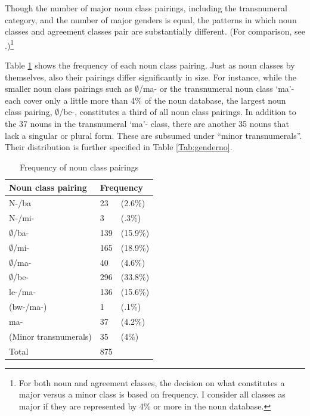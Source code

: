 \noindent Though the number of major noun class pairings, including the transnumeral category, and the number of major genders is equal, the patterns in which noun classes and agreement classes pair are substantially different. (For comparison, see .)\footnote{For both noun and agreement classes, the decision on what constitutes a major versus a minor class is based on frequency. I consider all classes as major if they are represented by 4\% or more in the noun database.}

Table \ref{Tab:NCpair} shows the frequency of each noun class pairing. Just as noun classes by themselves, also their pairings differ significantly in size. For instance, while the smaller noun class pairings such as $\emptyset$/ma- or the transnumeral noun class `ma'- each cover only a little more than 4\%  of the noun database, the largest noun class pairing, $\emptyset$/be-, constitutes a third of all noun class pairings. 
In addition to the 37 nouns in the transnumeral `ma'- class, there are another 35 nouns that lack a singular or plural form. These are subsumed under ``minor transnumerals''. Their distribution is further specified in Table \ref{Tab:genderno}.


\begin{table} 
\centering
\begin{tabular}{l|ll}
 \midrule
Noun class pairing	&  \multicolumn{2}{l}{Frequency} \\  \midrule
N-/ba 			& 23 & (2.6\%) \\
N-/mi- 			&   3 &  (.3\%) \\
$\emptyset$/ba- 	& 139  & (15.9\%) \\
$\emptyset$/mi- 	&   165 & (18.9\%) \\
$\emptyset$/ma- 	&   40  &  (4.6\%) \\
$\emptyset$/be- 	&   296 &  (33.8\%) \\
le-/ma- 			&   136 &  (15.6\%) \\
(bw-/ma-) 		&    1    &  (.1\%) \\
ma- 				&  37   &  (4.2\%) \\
(Minor transnumerals) & 35  & (4\%) \\  \midrule
Total 			& 875 & \\  \midrule
\end{tabular}
\caption{Frequency of noun class pairings}
\label{Tab:NCpair}
\end{table}






